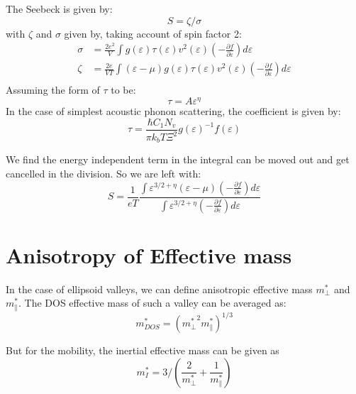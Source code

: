 \documentclass{article}
\begin{document}
The Seebeck is given by:
\begin{equation}
    S = \zeta / \sigma
\end{equation}
with $\zeta$ and $\sigma$ given by, taking account of spin factor 2:
\begin{align}
    \sigma &= \frac{2e^2}{V} \int g(\varepsilon)\tau(\varepsilon)v^2(\varepsilon)\left(-\frac{\partial f}{\partial \varepsilon}\right) d\varepsilon \\
    \zeta  &= \frac{2e}{VT} \int (\varepsilon - \mu) g(\varepsilon)\tau(\varepsilon)v^2(\varepsilon)\left(-\frac{\partial f}{\partial \varepsilon}\right) d\varepsilon \\
\end{align}
Assuming the form of $\tau$ to be:
\begin{equation}
    \tau = A\varepsilon^\eta
\end{equation}
In the case of simplest acoustic phonon scattering, the coefficient 
is given by:
\begin{equation}
    \tau = \frac{\hbar C_1 N_v}{\pi k_b T \Xi^2} g(\varepsilon)^{-1} f(\varepsilon)
\end{equation}

We find the energy independent term in the integral can be moved out and get cancelled in the division. 
So we are left with:
\begin{equation}
    S = \frac{1}{eT} \frac{\int \varepsilon^{3/2+\eta} (\varepsilon -\mu) \left(-\frac{\partial f}{\partial \varepsilon}\right) d\varepsilon} 
                {\int \varepsilon^{3/2+\eta} \left(-\frac{\partial f}{\partial \varepsilon}\right) d\varepsilon}
\end{equation}

\section{Anisotropy of Effective mass}
In the case of ellipsoid valleys, we can define anisotropic effective mass $m^*_{\perp}$ and $m^*_{\parallel}$. The
DOS effective mass of such a valley can be averaged as:
\begin{equation}
    m^*_{DOS} = ({m^*_{\perp}}^2 m^*_{\parallel})^{1/3}
\end{equation}

But for the mobility, the inertial effective mass can be given 
as 
\begin{equation}
    m^*_{I} = 3/(\frac{2}{m^*_{\perp}}+\frac{1}{m^*_{\parallel}})
\end{equation}
\end{document}
